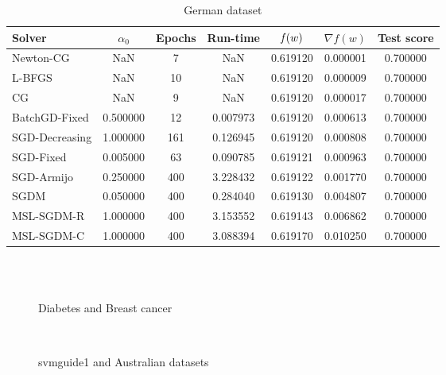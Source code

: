\begin{table}
\caption{German dataset}
\label{tab:german-tab}
\centering
\begin{tabular}{lS[round-precision=3]S[drop-zero-decimal]S[round-precision=4]S[round-precision=6]S[exponent-mode=scientific]S[round-precision=6]}
\toprule
Solver & {$\alpha_0$} & {Epochs} & {Run-time} & {$\operatorname*{\mathit{f}}(w)$} & {$\nabla f(w)$} & {Test score} \\
\midrule
Newton-CG & NaN & 7 & NaN & 0.619120 & 0.000001 & 0.700000 \\
L-BFGS & NaN & 10 & NaN & 0.619120 & 0.000009 & 0.700000 \\
CG & NaN & 9 & NaN & 0.619120 & 0.000017 & 0.700000 \\
BatchGD-Fixed & 0.500000 & 12 & 0.007973 & 0.619120 & 0.000613 & 0.700000 \\
SGD-Decreasing & 1.000000 & 161 & 0.126945 & 0.619120 & 0.000808 & 0.700000 \\
SGD-Fixed & 0.005000 & 63 & 0.090785 & 0.619121 & 0.000963 & 0.700000 \\
SGD-Armijo & 0.250000 & 400 & 3.228432 & 0.619122 & 0.001770 & 0.700000 \\
SGDM & 0.050000 & 400 & 0.284040 & 0.619130 & 0.004807 & 0.700000 \\
MSL-SGDM-R & 1.000000 & 400 & 3.153552 & 0.619143 & 0.006862 & 0.700000 \\
MSL-SGDM-C & 1.000000 & 400 & 3.088394 & 0.619170 & 0.010250 & 0.700000 \\
\bottomrule
\end{tabular}
\end{table}


\begin{figure}
\centering
 \\
 \\
\caption[]{Diabetes and Breast cancer}
\label{fig:diab-breast}
\end{figure}

\begin{figure}
\centering
 \\
\caption[]{svmguide1 and Australian datasets}
\label{fig:svm-austr}
\end{figure}

